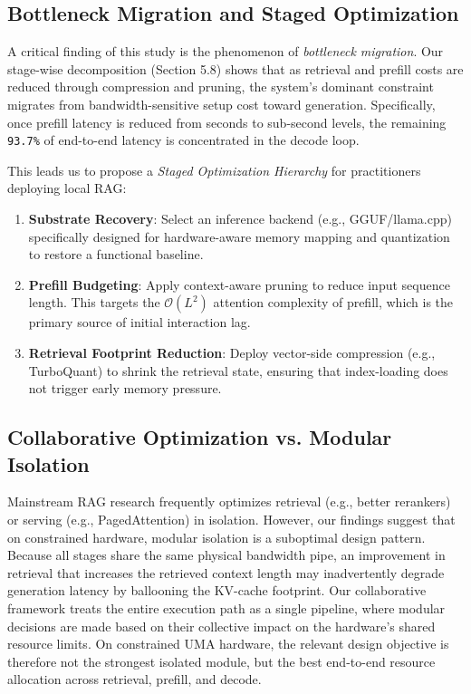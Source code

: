 \documentclass[10pt,twocolumn]{article}
\begin{document}
\subsection{Bottleneck Migration and Staged Optimization}

A critical finding of this study is the phenomenon of \emph{bottleneck migration}. Our stage-wise decomposition (Section 5.8) shows that as retrieval and prefill costs are reduced through compression and pruning, the system's dominant constraint migrates from bandwidth-sensitive setup cost toward generation. Specifically, once prefill latency is reduced from seconds to sub-second levels, the remaining \texttt{93.7\%} of end-to-end latency is concentrated in the decode loop.

This leads us to propose a \emph{Staged Optimization Hierarchy} for practitioners deploying local RAG:
\begin{enumerate}[leftmargin=1.5em, itemsep=0pt]
    \item \textbf{Substrate Recovery}: Select an inference backend (e.g., GGUF/llama.cpp) specifically designed for hardware-aware memory mapping and quantization to restore a functional baseline.
    \item \textbf{Prefill Budgeting}: Apply context-aware pruning to reduce input sequence length. This targets the $\mathcal{O}(L^2)$ attention complexity of prefill, which is the primary source of initial interaction lag.
    \item \textbf{Retrieval Footprint Reduction}: Deploy vector-side compression (e.g., TurboQuant) to shrink the retrieval state, ensuring that index-loading does not trigger early memory pressure.
\end{enumerate}

\subsection{Collaborative Optimization vs. Modular Isolation}

Mainstream RAG research frequently optimizes retrieval (e.g., better rerankers) or serving (e.g., PagedAttention) in isolation. However, our findings suggest that on constrained hardware, modular isolation is a suboptimal design pattern. Because all stages share the same physical bandwidth pipe, an improvement in retrieval that increases the retrieved context length may inadvertently degrade generation latency by ballooning the KV-cache footprint. Our collaborative framework treats the entire execution path as a single pipeline, where modular decisions are made based on their collective impact on the hardware's shared resource limits. On constrained UMA hardware, the relevant design objective is therefore not the strongest isolated module, but the best end-to-end resource allocation across retrieval, prefill, and decode.
\end{document}
